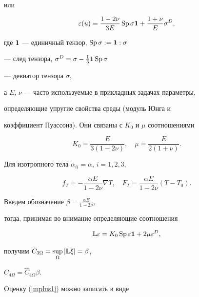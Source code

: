 или


$$


\varepsilon (u)=\frac{1-2\nu}{3E} \SP\sigma {\bold 1}


+ \frac{1+\nu}{E} \sigma^D,


$$


где $\bold 1$ --- единичный тензор, $\operatorname{Sp}\sigma := {\bold 1} : \sigma$


--- след тензора, $\sigma^D=\sigma-\frac{1}{3} {\bold 1} \operatorname{Sp}\sigma$


--- девиатор тензора $\sigma$,


а $E$, $\nu$ --- часто используемые в прикладных задачах параметры,


определяющие упругие свойства среды (модуль Юнга и


коэффициент Пуассона). Они связаны с $K_0$ и $\mu$ соотношениями


$$


K_0=\frac{E}{3(1-2\nu)}, \quad \mu = \frac{E}{2(1+\nu)}.


$$


Для изотропного тела $\alpha_{ii}=\alpha$, $i=1,2,3$,


$$


f_T=-\frac{\alpha E}{1-2\nu} \nabla T, \quad


F_T=\frac{\alpha E}{1-2\nu} (T-T_0).


$$


Введем обозначение $\beta=\frac{\alpha E}{1-2\nu}$,


тогда, принимая во внимание определяющие соотношения


$$


{\Bbb L}\varepsilon=K_0 \SP\varepsilon {\bold 1}+ 2\mu \varepsilon^D,


$$


получим $C_{3\Omega}=\sup\limits_\Omega| {\Bbb L}\xi |=\beta$,


$C_{4\Omega}=\widehat C_{4\Omega} \beta$.


Oценку (\ref{mplus1}) можно записать в виде


